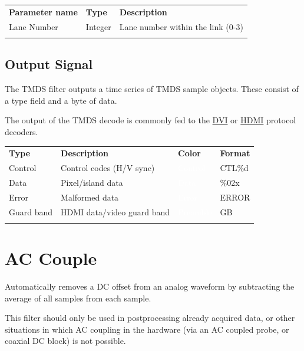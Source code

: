 \begin{tabularx}{16cm}{llX}
\thickhline
\textbf{Parameter name} & \textbf{Type} & \textbf{Description} \\
\thickhline
Lane Number & Integer & Lane number within the link (0-3)\\
\thickhline
\end{tabularx}

\subsection{Output Signal}

The TMDS filter outputs a time series of TMDS sample objects. These consist of a type field and a byte of data.

The output of the TMDS decode is commonly fed to the \hyperref[filter:dvi]{DVI} or \hyperref[filter:hdmi]{HDMI}
protocol decoders.

\begin{tabularx}{16cm}{lllX}
\thickhline
\textbf{Type} & \textbf{Description} & \textbf{Color} & \textbf{Format} \\
\thickhline
Control & Control codes (H/V sync) & \cellcolor{control}\textcolor{white}{Control} & CTL\%d \\
\thickhline
Data & Pixel/island data & \cellcolor{data}\textcolor{white}{Data} & \%02x \\
\thickhline
Error & Malformed data & \cellcolor{error}\textcolor{white}{Error} & ERROR \\
\thickhline
Guard band & HDMI data/video guard band & \cellcolor{preamble}\textcolor{white}{Preamble} & GB \\
\thickhline
\end{tabularx}

\pagebreak
\section{AC Couple}
\label{filter:accouple}

Automatically removes a DC offset from an analog waveform by subtracting the average of all samples from each sample.

This filter should only be used in postprocessing already acquired data, or other situations in which AC coupling in
the hardware (via an AC coupled probe, or coaxial DC block) is not possible.


